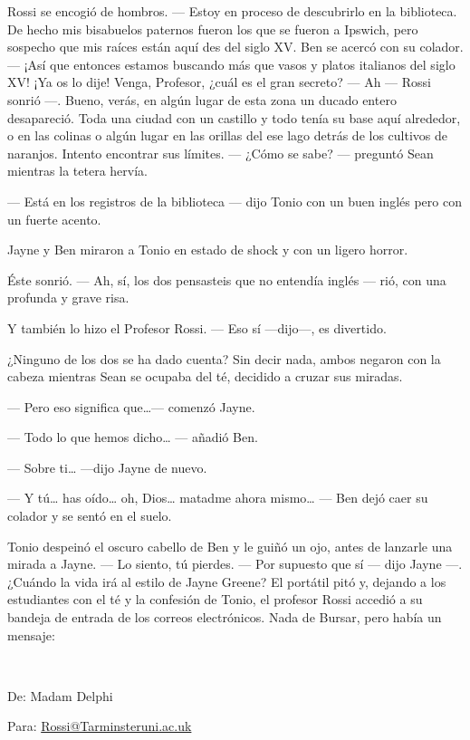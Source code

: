 Rossi se encogió de hombros. --- Estoy en proceso de descubrirlo en la
biblioteca. De hecho mis bisabuelos paternos fueron los que se fueron a
Ipswich, pero sospecho que mis raíces están aquí des del siglo XV. Ben
se acercó con su colador. --- ¡Así que entonces estamos buscando más que
vasos y platos italianos del siglo XV! ¡Ya os lo dije! Venga, Profesor,
¿cuál es el gran secreto? --- Ah --- Rossi sonrió ---. Bueno, verás, en
algún lugar de esta zona un ducado entero desapareció. Toda una ciudad
con un castillo y todo tenía su base aquí alrededor, o en las colinas o
algún lugar en las orillas del ese lago detrás de los cultivos de
naranjos. Intento encontrar sus límites. --- ¿Cómo se sabe? --- preguntó
Sean mientras la tetera hervía.

--- Está en los registros de la biblioteca --- dijo Tonio con un buen
inglés pero con un fuerte acento.

Jayne y Ben miraron a Tonio en estado de shock y con un ligero horror.

Éste sonrió. --- Ah, sí, los dos pensasteis que no entendía inglés ---
rió, con una profunda y grave risa.

Y también lo hizo el Profesor Rossi. --- Eso sí ---dijo---, es
divertido.

¿Ninguno de los dos se ha dado cuenta? Sin decir nada, ambos negaron con
la cabeza mientras Sean se ocupaba del té, decidido a cruzar sus
miradas.

--- Pero eso significa que\ldots{}--- comenzó Jayne.

--- Todo lo que hemos dicho\ldots{} --- añadió Ben.

--- Sobre ti\ldots{} ---dijo Jayne de nuevo.

--- Y tú\ldots{} has oído\ldots{} oh, Dios\ldots{} matadme ahora
mismo\ldots{} --- Ben dejó caer su colador y se sentó en el suelo.

Tonio despeinó el oscuro cabello de Ben y le guiñó un ojo, antes de
lanzarle una mirada a Jayne. --- Lo siento, tú pierdes. --- Por supuesto
que sí --- dijo Jayne ---. ¿Cuándo la vida irá al estilo de Jayne
Greene? El portátil pitó y, dejando a los estudiantes con el té y la
confesión de Tonio, el profesor Rossi accedió a su bandeja de entrada de
los correos electrónicos. Nada de Bursar, pero había un mensaje:

~

De: Madam Delphi

Para: \href{mailto:Rossi@Tarminsteruni.ac.uk}{Rossi@Tarminsteruni.ac.uk}

